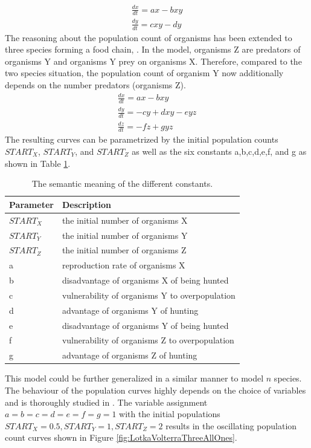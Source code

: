 \documentclass[11pt]{article}
\begin{document}
\begin{equation}
\begin{split}
\frac{dx}{dt} = ax-bxy \\ 
\frac{dy}{dt} = cxy-dy
\end{split}
\end{equation}
The reasoning about the population count of organisms has been extended to three species forming a food chain, \cite{lotkaVolterraThreeSpecies}. In the model, organisms Z are predators of organisms Y and organisms Y prey on organisms X. Therefore, compared to the two species situation, the population count of organism Y now additionally depends on the number predators (organisms Z).
\begin{equation}
\begin{split}
\frac{dx}{dt} = ax-bxy \\ 
\frac{dy}{dt} = -cy+dxy-eyz \\ 
\frac{dz}{dt} = -fz+gyz
\end{split}
\end{equation}
The resulting curves can be parametrized by the initial population counts $START_X$, $START_Y$, and $START_Z$ as well as the six constants a,b,c,d,e,f, and g as shown in Table \ref{tab:LotkaVolterraParameters}.
\begin{table}[htbp]
\centering
\begin{tabular}{l|l}
Parameter & Description \\ 
\hline 
\hline 
$START_X$ & the initial number of organisms X\\
\hline
$START_Y$ & the initial number of organisms Y\\
\hline
$START_Z$ & the initial number of organisms Z\\
\hline
a & reproduction rate of organisms X\\ 
\hline 
b & disadvantage of organisms X of being hunted\\ 
\hline 
c & vulnerability of organisms Y to overpopulation\\  
\hline 
d & advantage of organisms Y of hunting\\
\hline 
e & disadvantage of organisms Y of being hunted\\
\hline 
f & vulnerability of organisms Z to overpopulation\\
\hline 
g & advantage of organisms Z of hunting\\
\end{tabular}
\caption{The semantic meaning of the different constants.}
\label{tab:LotkaVolterraParameters}
\end{table}
This model could be further generalized in a similar manner to model $n$ species. The behaviour of the population curves highly depends on the choice of variables and is thoroughly studied in \cite{lotkaVolterraThreeSpecies}. The variable assignment $a=b=c=d=e=f=g=1$ with the initial populations $START_X= 0.5,START_Y = 1, START_Z=2$ results in the oscillating population count curves shown in Figure \ref{fig:LotkaVolterraThreeAllOnes}. 
\end{document}
